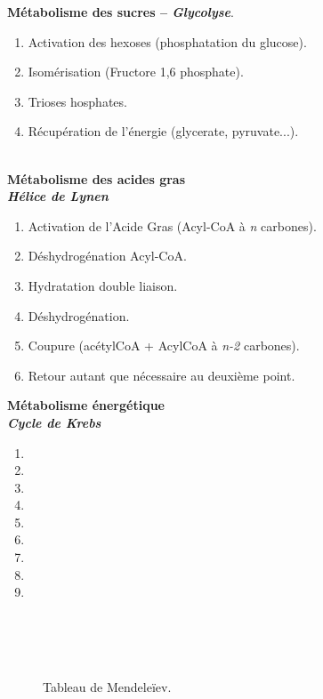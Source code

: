 \documentclass[11pt,twoside,a4paper]{article}
\begin{document}
\begin{minipage}[c]{10cm}
\textbf{M{\'e}tabolisme des sucres -- \emph{Glycolyse}}. 
\begin{enumerate}
	\item Activation des hexoses (phosphatation du glucose). 
	\item Isom{\'e}risation (Fructore 1,6 phosphate). 
	\item Trioses hosphates. 
	\item R{\'e}cup{\'e}ration de l'{\'e}nergie (glycerate, pyruvate...). 
\end{enumerate}~\\
\textbf{M{\'e}tabolisme des acides gras~\\ \emph{H{\'e}lice de Lynen}}
\begin{enumerate}
	\item Activation de l'Acide Gras (Acyl-CoA {\`a} \emph{n} carbones). 
	\item D{\'e}shydrog{\'e}nation Acyl-CoA. 
	\item Hydratation double liaison. 
	\item D{\'e}shydrog{\'e}nation. 
	\item Coupure (ac{\'e}tylCoA + AcylCoA {\`a} \emph{n-2} carbones). 
	\item Retour autant que n{\'e}cessaire au deuxi{\`e}me point. 
\end{enumerate}
\end{minipage}\hfill
\begin{minipage}[c]{8cm}
\textbf{M{\'e}tabolisme {\'e}nerg{\'e}tique~\\ \emph{Cycle de Krebs}}
\begin{enumerate}
	\item 
	\item 
	\item 
	\item 
	\item 
	\item 
	\item 
	\item 
	\item 
\end{enumerate}~\\~\\~\\
\end{minipage}

\clearpage

\begin{figure}[H]
	\centerline {}
	\caption{Tableau de Mendele{\"i}ev. }
	\label{fig:mendeleievTable}
\end{figure}
\end{document}

